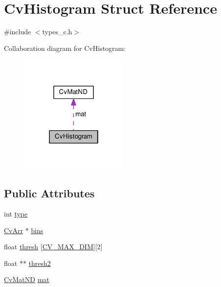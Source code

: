 \hypertarget{structCvHistogram}{\section{Cv\-Histogram Struct Reference}
\label{structCvHistogram}
}


{\ttfamily \#include $<$types\-\_\-c.\-h$>$}



Collaboration diagram for Cv\-Histogram\-:\nopagebreak
\begin{figure}[H]
\begin{center}
\leavevmode
\includegraphics[width=154pt]{structCvHistogram__coll__graph}
\end{center}
\end{figure}
\subsection*{Public Attributes}
\begin{DoxyCompactItemize}
\item 
int \hyperlink{structCvHistogram_a7756d84a7aac81bd6bde2e5f5b70bc04}{type}
\item 
\hyperlink{core_2types__c_8h_ac5046bc0456e9295d80b37774384798c}{Cv\-Arr} $\ast$ \hyperlink{structCvHistogram_a0e35427a99b709c43c92e8c8bb8a3019}{bins}
\item 
float \hyperlink{structCvHistogram_a9df34c3db55a11ae8c96a1d87b41a5a6}{thresh} \mbox{[}\hyperlink{core_2types__c_8h_a931cb1f0da753cc1f8a3f838390616c2}{C\-V\-\_\-\-M\-A\-X\-\_\-\-D\-I\-M}\mbox{]}\mbox{[}2\mbox{]}
\item 
float $\ast$$\ast$ \hyperlink{structCvHistogram_a54078c0f947e41860cdd9139beed48df}{thresh2}
\item 
\hyperlink{structCvMatND}{Cv\-Mat\-N\-D} \hyperlink{structCvHistogram_a363eff76e137cbf655a4f6d50b55a6f6}{mat}
\end{DoxyCompactItemize}


